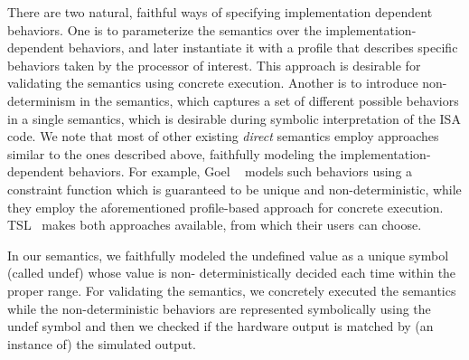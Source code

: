 There are two natural, faithful ways of specifying implementation dependent
behaviors.  One is to parameterize the semantics over the
implementation-dependent behaviors, and later instantiate it with a profile
that describes specific behaviors taken by the processor of interest. This
approach is desirable for validating the semantics using concrete execution.
Another is to introduce non-determinism in the semantics, which captures a set
of different possible behaviors in a single semantics, which is desirable
during symbolic interpretation of the ISA code.  We note that most of other
existing \emph{direct} \ISA semantics employ approaches similar to the ones
described above, faithfully modeling the implementation-dependent behaviors.
For example, Goel \etal~\cite{Goel:ProCoS17} models such behaviors using a
constraint function which is guaranteed to be unique and non-deterministic,
           while they employ the aforementioned profile-based approach for
           concrete execution.  TSL~\cite{TSL:TOPLAS13} makes both approaches
           available, from which their users can choose.

In our semantics, we faithfully modeled the undefined value as a unique symbol
(called undef) whose value is non- deterministically decided each time within
the proper range. For validating the semantics, we concretely executed the
semantics while the non-deterministic behaviors are represented symbolically
using the undef symbol and then we checked if the hardware output is matched by
(an instance of) the simulated output.

